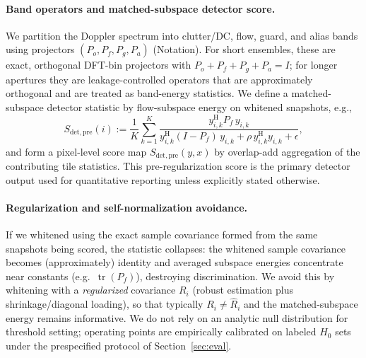 \documentclass[11pt]{article}
\newcommand{\wh}{\widehat}
\newcommand{\Hh}{^{\mathrm{H}}}
\newcommand{\tr}{\operatorname{tr}}
\newcommand{\Pf}{P_f}
\newcommand{\Pa}{P_a}
\newcommand{\Po}{P_o}
\newcommand{\Pg}{P_g}
\begin{document}
\paragraph{Band operators and matched-subspace detector score.}
We partition the Doppler spectrum into clutter/DC, flow, guard, and alias bands using projectors $(\Po,\Pf,\Pg,\Pa)$ (Notation). For short ensembles, these are exact, orthogonal DFT-bin projectors with $\Po+\Pf+\Pg+\Pa=I$; for longer apertures they are leakage-controlled operators that are approximately orthogonal and are treated as band-energy statistics. We define a matched-subspace detector statistic by flow-subspace energy on whitened snapshots, e.g.,
\[
  S_{\mathrm{det,pre}}(i) := \frac{1}{K}\sum_{k=1}^K
  \frac{y_{i,k}\Hh \Pf\, y_{i,k}}{y_{i,k}\Hh (I-\Pf)\, y_{i,k}+\rho\, y_{i,k}\Hh y_{i,k}+\epsilon},
\]
and form a pixel-level score map $S_{\mathrm{det,pre}}(y,x)$ by overlap-add aggregation of the contributing tile statistics. This pre-regularization score is the primary detector output used for quantitative reporting unless explicitly stated otherwise.

\paragraph{Regularization and self-normalization avoidance.}
If we whitened using the exact sample covariance formed from the same snapshots being scored, the statistic collapses: the whitened sample covariance becomes (approximately) identity and averaged subspace energies concentrate near constants (e.g.\ $\tr(\Pf)$), destroying discrimination. We avoid this by whitening with a \emph{regularized} covariance $R_i$ (robust estimation plus shrinkage/diagonal loading), so that typically $R_i \neq \wh R_i$ and the matched-subspace energy remains informative. We do not rely on an analytic null distribution for threshold setting; operating points are empirically calibrated on labeled $H_0$ sets under the prespecified protocol of Section~\ref{sec:eval}.
\end{document}
